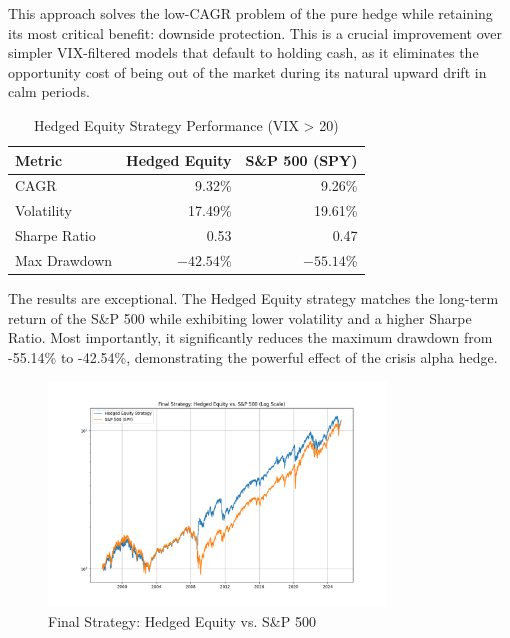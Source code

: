 \documentclass{article}
\begin{document}
This approach solves the low-CAGR problem of the pure hedge while retaining its most critical benefit: downside protection. This is a crucial improvement over simpler VIX-filtered models that default to holding cash, as it eliminates the opportunity cost of being out of the market during its natural upward drift in calm periods.

\begin{table}[htbp]
\centering
\caption{Hedged Equity Strategy Performance (VIX > 20)}
\begin{tabular}{lrr}
\toprule
\textbf{Metric} & \textbf{Hedged Equity} & \textbf{S\&P 500 (SPY)} \\
\midrule
CAGR           & 9.32\%    & 9.26\%         \\
Volatility     & 17.49\%   & 19.61\%        \\
Sharpe Ratio   & 0.53      & 0.47           \\
Max Drawdown   & $-42.54$\% & $-55.14$\%      \\
\bottomrule
\end{tabular}
\end{table}

The results are exceptional. The Hedged Equity strategy matches the long-term return of the S\&P 500 while exhibiting lower volatility and a higher Sharpe Ratio. Most importantly, it significantly reduces the maximum drawdown from -55.14\% to -42.54\%, demonstrating the powerful effect of the crisis alpha hedge.

\begin{figure}[htbp]
    \centering
    \includegraphics[width=0.8\textwidth]{plots/plot_hedged_equity_curve.png}
    \caption{Final Strategy: Hedged Equity vs. S\&P 500}
    \label{fig:hedged_equity_curve}
\end{figure}
\end{document}
